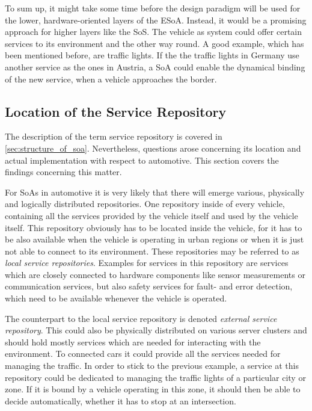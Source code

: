 To sum up, it might take some time before the design paradigm will be used for the lower, hardware-oriented layers of the ESoA. Instead, it would be a promising approach for higher layers like the SoS. The vehicle as system could offer certain services to its environment and the other way round. A good example, which has been mentioned before, are traffic lights. If the the traffic lights in Germany use another service as the ones in Austria, a SoA could enable the dynamical binding of the new service, when a vehicle approaches the border.


\subsection{Location of the Service Repository}
The description of the term service repository is covered in \ref{sec:structure_of_soa}. Nevertheless, questions arose concerning its location and actual implementation with respect to automotive. This section covers the findings concerning this matter.

For SoAs in automotive it is very likely that there will emerge various, physically and logically distributed repositories. One repository inside of every vehicle, containing all the services provided by the vehicle itself and used by the vehicle itself. This repository obviously has to be located inside the vehicle, for it has to be also available when the vehicle is operating in urban regions or when it is just not able to connect to its environment. These repositories may be referred to as \emph{local service repositories}. Examples for services in this repository are services which are closely connected to hardware components like sensor measurements or communication services, but also safety services for fault- and error detection, which need to be available whenever the vehicle is operated.

The counterpart to the local service repository is denoted \emph{external service repository}. This could also be physically distributed on various server clusters and should hold mostly services which are needed for interacting with the environment. To connected cars it could provide all the services needed for managing the traffic. In order to stick to the previous example, a service at this repository could be dedicated to managing the traffic lights of a particular city or zone. If it is bound by a vehicle operating in this zone, it should then be able to decide automatically, whether it has to stop at an intersection.

